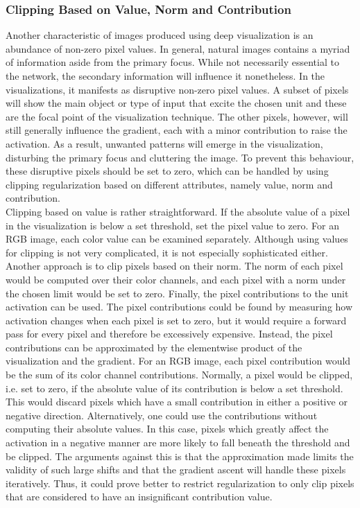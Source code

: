 \subsubsection{Clipping Based on Value, Norm and Contribution}

Another characteristic of images produced using deep visualization is an abundance of non-zero pixel values. In general, natural images contains a myriad of information aside from the primary focus. While not necessarily essential to the network, the secondary information will influence it nonetheless. In the visualizations, it manifests as disruptive non-zero pixel values. A subset of pixels will show the main object or type of input that excite the chosen unit and these are the focal point of the visualization technique. The other pixels, however, will still generally influence the gradient, each with a minor contribution to raise the activation. As a result, unwanted patterns will emerge in the visualization, disturbing the primary focus and cluttering the image. To prevent this behaviour, these disruptive pixels should be set to zero, which can be handled by using clipping regularization based on different attributes, namely value, norm and contribution. \\

\noindent Clipping based on value is rather straightforward. If the absolute value of a pixel in the visualization is below a set threshold, set the pixel value to zero. For an RGB image, each color value can be examined separately. Although using values for clipping is not very complicated, it is not especially sophisticated either. Another approach is to clip pixels based on their norm. The norm of each pixel would be computed over their color channels, and each pixel with a norm under the chosen limit would be set to zero. Finally, the pixel contributions to the unit activation can be used. The pixel contributions could be found by measuring how activation changes when each pixel is set to zero, but it would require a forward pass for every pixel and therefore be excessively expensive. Instead, the pixel contributions can be approximated by the elementwise product of the visualization and the gradient. For an RGB image, each pixel contribution would be the sum of its color channel contributions. Normally, a pixel would be clipped, i.e. set to zero, if the absolute value of its contribution is below a set threshold. This would discard pixels which have a small contribution in either a positive or negative direction. Alternatively, one could use the contributions without computing their absolute values. In this case, pixels which greatly affect the activation in a negative manner are more likely to fall beneath the threshold and be clipped. The arguments against this is that the approximation made limits the validity of such large shifts and that the gradient ascent will handle these pixels iteratively. Thus, it could prove better to restrict regularization to only clip pixels that are considered to have an insignificant contribution value. 

